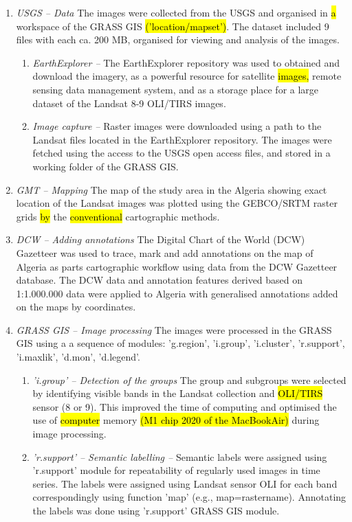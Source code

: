 \documentclass[asi,article,submit,pdftex,moreauthors]{Definitions/mdpi}
\begin{document}
\begin{enumerate}
\itemsep0em
	\item \emph{USGS -- Data } The images were collected from the USGS and organised in \hl{a} workspace of the GRASS GIS \hl{('location/mapset')}. The dataset included 9 files with each ca. 200 MB, organised for viewing and analysis of the images. 
	\begin{enumerate}
		\item \emph{EarthExplorer -- } The EarthExplorer repository was used to obtained and download the imagery, as a powerful resource for satellite \hl{images, }remote sensing data management system, and as a storage place for a large dataset of the Landsat 8-9 OLI/TIRS images.
		\item \emph{Image capture -- } Raster images were downloaded using a path to the Landsat files located in the EarthExplorer repository. The images were fetched using the access to the USGS open access files, and stored in a working folder of the GRASS GIS.		
	\end{enumerate}
	\item \emph{GMT -- Mapping } The map of the study area in the Algeria showing exact location of the Landsat images was plotted using the GEBCO/SRTM raster grids\hl{ by} the \hl{conventional }cartographic methods.	
	\item \emph{DCW -- Adding annotations} The Digital Chart of the World (DCW) Gazetteer was used to trace, mark and add annotations on the map of Algeria as parts cartographic workflow using data from the DCW Gazetteer database. The DCW data and annotation features derived based on 1:1.000.000 data were applied to Algeria with generalised annotations added on the maps by coordinates.	
	\item \emph{GRASS GIS -- Image processing} The images were processed in the GRASS GIS using a a sequence of modules: 'g.region', 'i.group', 'i.cluster', 'r.support', 'i.maxlik', 'd.mon', 'd.legend'.	
		\begin{enumerate}
			\item \emph{'i.group' -- Detection of the groups} The group and subgroups were selected by identifying visible bands in the Landsat collection and \hl{OLI/TIRS} sensor (8 or 9). This improved the time of computing and optimised the use of \hl{computer }memory \hl{(M1 chip 2020 of the MacBookAir)} during image processing.  
			\item \emph{'r.support' -- Semantic labelling --} Semantic labels were assigned using 'r.support' module for repeatability of regularly used images in time series. The labels were assigned using Landsat sensor OLI for each band correspondingly using function 'map' (e.g., map=rastername). Annotating the labels was done using 'r.support' GRASS GIS module.

\end{enumerate}
\end{enumerate}
\end{document}
